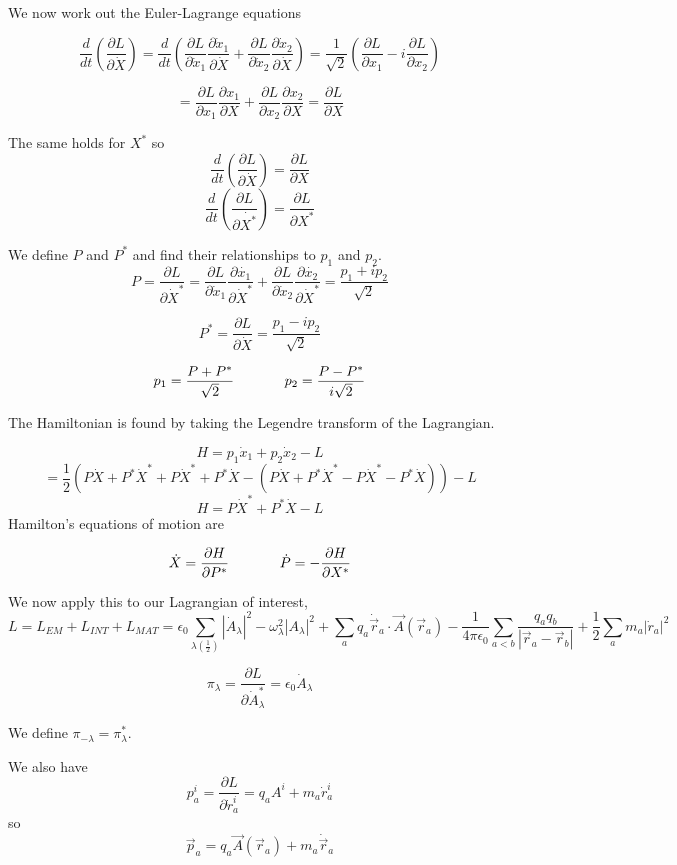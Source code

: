 \documentclass[12pt]{article}
\newcommand{\pardiv}[2][]{\frac{\partial #1}{\partial #2}}
\begin{document}
We now work out the Euler-Lagrange equations

\[ \frac{d}{dt} \left(\pardiv[L]{\dot{X}}\right) = \frac{d}{dt}\left(\pardiv[L]{\dot{x}_1}\pardiv[\dot{x}_1]{\dot{X}} +  \pardiv[L]{\dot{x}_2}\pardiv[\dot{x}_2]{\dot{X}}\right) = \frac{1}{\sqrt{2}} \left(\pardiv[L]{x_1} -i \pardiv[L]{x_2} \right) \]

\[ = \pardiv[L]{x_1} \pardiv[x_1]{X} + \pardiv[L]{x_2} \pardiv[x_2]{X} = \pardiv[L]{X} \] 

The same holds for $X^*$ so
\[ \frac{d}{dt} \left(\pardiv[L]{\dot{X}}\right) = \pardiv[L]{X}\]
\[ \frac{d}{dt} \left(\pardiv[L]{\dot{X^*}}\right) = \pardiv[L]{X^*}\]

We define $P$ and $P^*$ and find their relationships to $p_1$ and $p_2$.
\[P = \pardiv[L]{\dot{X}^*} = \pardiv[L]{\dot{x}_1} \pardiv[\dot{x_1}]{\dot{X}^*} + \pardiv[L]{\dot{x}_2} \pardiv[\dot{x_2}]{\dot{X}^*} = \frac{p_1+ip_2}{\sqrt{2}}  \]

\[P^* = \pardiv[L]{\dot{X}} = \frac{p_1-ip_2}{\sqrt{2}} \]

\[ p_1 = \frac{P+P^*}{\sqrt{2}} \hspace{.5 in} p_2 = \frac{P-P^*}{i\sqrt{2}} \]

The Hamiltonian is found by taking the Legendre transform of the Lagrangian.

\[H = p_1\dot{x}_1 + p_2 \dot{x}_2 - L\]
\[ = \frac{1}{2}\left(P\dot{X} + P^*\dot{X}^* + P\dot{X}^* +P^*\dot{X} - (P\dot{X} +P^*\dot{X}^* -P\dot{X}^*-P^*\dot{X})\right) -L\]
\[H = P\dot{X}^* + P^*\dot{X} -L \]
Hamilton's equations of motion are

\[\dot{X} = \pardiv[H]{P^*} \hspace{.5 in} \dot{P} = -\pardiv[H]{X^*} \]

We now apply this to our Lagrangian of interest,
\[L=L_{EM} +L_{INT} +L_{MAT}= \epsilon_0 \sum_{\lambda \left(\frac{1}{2}\right)} |\dot{A}_{\lambda}|^2 -\omega_{\lambda}^2|A_{\lambda}|^2 + \sum_{a} q_a \dot{\vec{r}}_a\cdot\vec{A}(\vec{r}_a) - \frac{1}{4\pi \epsilon_0} \sum_{a<b} \frac{q_a q_b}{|\vec{r}_a-\vec{r}_b|} + \frac{1}{2}\sum_a m_a |\dot{r}_a|^2 \]

\[ \pi_{\lambda} = \pardiv[L]{\dot{A}_{\lambda}^*} = \epsilon_0 \dot{A}_{\lambda} \]

We define $\pi_{-\lambda} = \pi_{\lambda}^*$.

We also have
\[p_a^i = \pardiv[L]{\dot{r}_a^i} = q_a A^i + m_a \dot{r}_a^i\] 
so 
\[\vec{p}_a = q_a \vec{A}(\vec{r}_a) +m_a \dot{\vec{r}}_a\]
\end{document}
